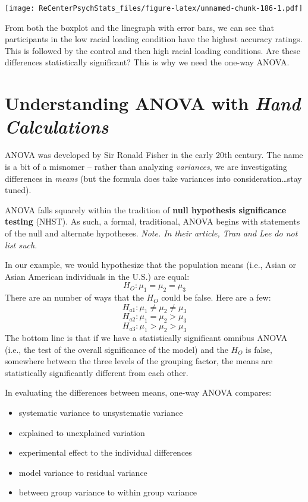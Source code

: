 \documentclass[
  11pt,
]{book}
\providecommand{\tightlist}{%
  \setlength{\itemsep}{0pt}\setlength{\parskip}{0pt}}
\begin{document}
\texttt{[image: ReCenterPsychStats\_files/figure-latex/unnamed-chunk-186-1.pdf]}

From both the boxplot and the linegraph with error bars, we can see that participants in the low racial loading condition have the highest accuracy ratings. This is followed by the control and then high racial loading conditions. Are these differences statistically significant? This is why we need the one-way ANOVA.

\hypertarget{understanding-anova-with-hand-calculations}{%
\section{\texorpdfstring{Understanding ANOVA with \emph{Hand Calculations}}{Understanding ANOVA with Hand Calculations}}\label{understanding-anova-with-hand-calculations}}

ANOVA was developed by Sir Ronald Fisher in the early 20th century. The name is a bit of a misnomer -- rather than analyzing \emph{variances}, we are investigating differences in \emph{means} (but the formula does take variances into consideration\ldots stay tuned).

ANOVA falls squarely within the tradition of \textbf{null hypothesis significance testing} (NHST). As such, a formal, traditional, ANOVA begins with statements of the null and alternate hypotheses. \emph{Note. In their article, Tran and Lee \citeyearpar{tran_you_2014} do not list such.}

In our example, we would hypothesize that the population means (i.e., Asian or Asian American individuals in the U.S.) are equal:
\[H_{O}: \mu _{1} = \mu _{2} = \mu _{3}\]
There are an number of ways that the \(H_{O}\) could be false. Here are a few:
\[H_{a1}: \mu _{1} \neq \mu _{2} \neq \mu _{3}\]
\[H_{a2}: \mu _{1} = \mu _{2} > \mu _{3}\]
\[H_{a3}: \mu _{1} > \mu _{2} > \mu _{3}\]
The bottom line is that if we have a statistically significant omnibus ANOVA (i.e., the test of the overall significance of the model) and the \(H_{O}\) is false, somewhere between the three levels of the grouping factor, the means are statistically significantly different from each other.

In evaluating the differences between means, one-way ANOVA compares:

\begin{itemize}
\tightlist
\item
  systematic variance to unsystematic variance
\item
  explained to unexplained variation
\item
  experimental effect to the individual differences
\item
  model variance to residual variance
\item
  between group variance to within group variance
\end{itemize}
\end{document}
